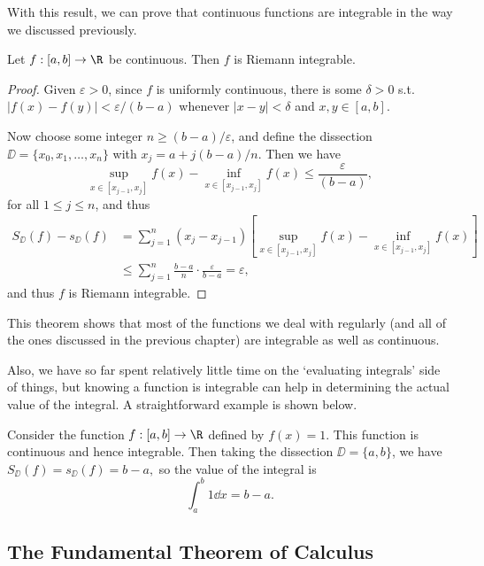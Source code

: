 With this result, we can prove that continuous functions are integrable in the way we discussed previously.


\begin{theorem}
	Let $f:[a, b] \rightarrow \R$ be continuous. Then $f$ is Riemann integrable.
\end{theorem}
\begin{proof}
	Given $\varepsilon > 0$, since $f$ is uniformly continuous, there is some $\delta > 0$ s.t. $|f(x) - f(y)| < \varepsilon/(b - a)$ whenever $|x - y| < \delta$ and $x, y \in [a, b]$.

	Now choose some integer $n \geq (b - a)/\varepsilon$, and define the dissection $\DD = \{x_0, x_1, \dots, x_n\}$ with $x_j = a + j(b - a)/n$. Then we have
	$$
	\sup_{x \in [x_{j - 1}, x_j]} f(x) - \inf_{x \in [x_{j - 1}, x_j]} f(x) \leq \frac{\varepsilon}{(b - a)},
	$$
	for all $1 \leq j \leq n$, and thus 
	\begin{align*}
		S_\DD(f) - s_\DD(f) &= \sum_{j = 1}^n (x_j - x_{j - 1})\left[\sup_{x \in [x_{j - 1}, x_j]} f(x) - \inf_{x \in [x_{j - 1}, x_j]} f(x)\right] \\
		&\leq \sum_{j = 1}^n \frac{b - a}{n} \cdot \frac{\varepsilon}{b - a} = \varepsilon,
	\end{align*}
	and thus $f$ is Riemann integrable.
\end{proof}

This theorem shows that most of the functions we deal with regularly (and all of the ones discussed in the previous chapter) are integrable as well as continuous.


Also, we have so far spent relatively little time on the `evaluating integrals' side of things, but knowing a function is integrable can help in determining the actual value of the integral. A straightforward example is shown below.

\begin{example}[Integral of $f(x) = 1$]
	Consider the function $f:[a, b] \rightarrow \R$ defined by $f(x) = 1$. This function is continuous and hence integrable. Then taking the dissection $\DD = \{a, b\}$, we have
	$
	S_{\DD}(f) = s_{\DD}(f) = b - a,
	$ so the value of the integral is
	$$
	\int_a^b 1 \dd x = b - a.
	$$
\end{example}


\subsection{The Fundamental Theorem of Calculus}


